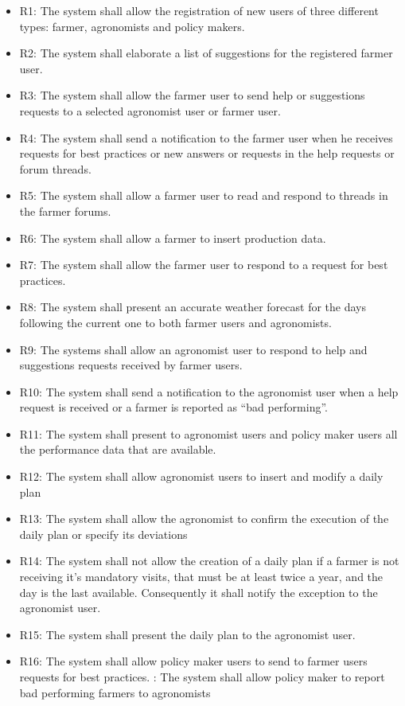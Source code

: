\documentclass{article}
\begin{document}
    \begin{itemize}
        \item R1: The system shall allow the registration of new users of three different types: farmer, agronomists and policy makers.
        \item R2: The system shall elaborate a list of suggestions for the registered farmer user.
        \item R3: The system shall allow the farmer user to send help or suggestions requests to a selected agronomist user or farmer user.
        \item R4: The system shall send a notification to the farmer user when he receives requests for best practices or new answers or requests in the help requests or forum threads.
        \item R5: The system shall allow a farmer user to read and respond to threads in the farmer forums.
        \item R6: The system shall allow a farmer to insert production data.
        \item R7: The system shall allow the farmer user to respond to a request for best practices.
        \item R8: The system shall present an accurate weather forecast for the days following the current one to both farmer users and agronomists.
        \item R9: The systems shall allow an agronomist user to respond to help and suggestions requests received by farmer users.
        \item R10: The system shall send a notification to the agronomist user when a help request is received or a farmer is reported as “bad performing”.
        \item R11: The system shall present to agronomist users and policy maker users all the performance data that are available.
        \item R12: The system shall allow agronomist users to insert and modify a daily plan
        \item R13: The system shall allow the agronomist to confirm the execution of the daily plan or specify its deviations
        \item R14: The system shall not allow the creation of a daily plan if a farmer is not receiving it’s mandatory visits, that must be at least twice a year, and the day is the last available. Consequently it shall notify the exception to the agronomist user.
        \item R15: The system shall present the daily plan to the agronomist user.
        \item R16: The system shall allow policy maker users to send to farmer users requests for best practices.
        : The system shall allow policy maker to report bad performing farmers to agronomists

    \end{itemize}
\end{document}
